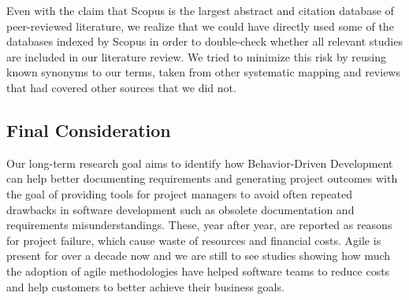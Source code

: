 Even with the claim that Scopus is the largest abstract and citation database of peer-reviewed literature, we realize that we could have directly used some of the databases indexed by Scopus in order to double-check whether all relevant studies are included in our literature review. We tried to minimize this risk by reusing known synonyms to our terms, taken from other systematic mapping and reviews that had covered other sources that we did not.

\subsection{Final Consideration}
Our long-term research goal aims to identify how Behavior-Driven Development can help better documenting requirements and generating project outcomes with the goal of providing tools for project managers to avoid often repeated drawbacks in software development such as obsolete documentation and requirements misunderstandings. These, year after year, are reported as reasons for project failure, which cause waste of resources and financial costs. Agile is present for over a decade now and we are still to see studies showing how much the adoption of agile methodologies have helped software teams to reduce costs and help customers to better achieve their business goals. 



